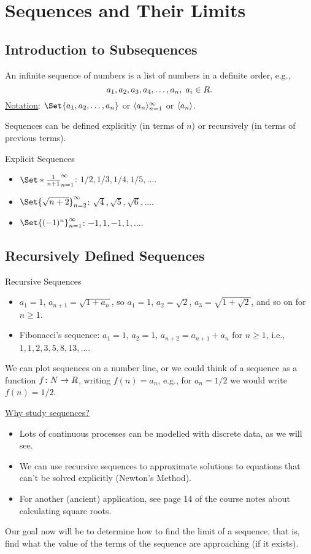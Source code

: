 \section{Sequences and Their Limits}
\subsection{Introduction to Subsequences}
\begin{Definition}{}{}
    An infinite sequence of numbers is a list of numbers in a definite order, e.g.,
    \[ a_1,a_2,a_3,a_4,\ldots,a_n,\; a_i\in\relax{R}. \]
    \underline{Notation}: $ \Set{a_1,a_2,\ldots,a_n} $ or $ \langle a_n\rangle_{n=1}^{\infty} $ or $ \langle a_n\rangle $.
\end{Definition}
Sequences can be defined explicitly (in terms of $ n $) or recursively (in terms of previous terms).
\begin{Example}{Explicit Sequences}{}
    \begin{itemize}
        \item $ \Set*{\frac{1}{n+1}}_{n=1}^{\infty} $: $ 1/2,1/3,1/4,1/5,\ldots $.
        \item $ \Set{\sqrt{n+2}}_{n=2}^{\infty} $: $ \sqrt{4},\sqrt{5},\sqrt{6},\ldots $.
        \item $ \Set{(-1)^n}_{n=1}^\infty $: $ -1,1,-1,1,\ldots $.
    \end{itemize}
\end{Example}
\subsection{Recursively Defined Sequences}
\begin{Example}{Recursive Sequences}{}
    \begin{itemize}
        \item $ a_1=1 $, $ a_{n+1}=\sqrt{1+a_n} $, so $ a_1=1 $, $ a_2=\sqrt{2} $, $ a_3=\sqrt{1+\sqrt{2}} $, and so on for $ n\ge 1 $.
        \item Fibonacci's sequence: $ a_1=1 $, $ a_2=1 $, $ a_{n+2}=a_{n+1}+a_n $ for $ n\ge 1 $, i.e.,
              $ 1,1,2,3,5,8,13,\ldots $.
    \end{itemize}
\end{Example}
We can plot sequences on a number line, or we could think of a sequence as a function $ f\colon \relax{N}\to\relax{R} $, writing $ f(n)=a_n $, e.g.,
for $ a_n=1/2 $ we would write $ f(n)=1/2 $.

\underline{Why study sequences?}
\begin{itemize}
    \item Lots of continuous processes can be modelled with discrete data, as we will see.
    \item We can use recursive sequences to approximate solutions to equations that can't be solved explicitly (Newton's Method).
    \item For another (ancient) application, see page 14 of the course notes about calculating square roots.
\end{itemize}
Our goal now will be to determine how to find the limit of a sequence, that is, find what the value of the terms of the sequence
are approaching (if it exists).

